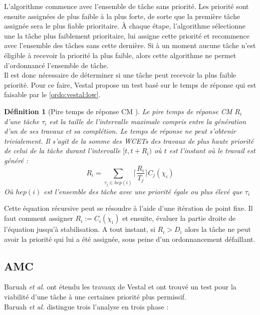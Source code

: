 \documentclass[12pt,a4paper,oneside]{book}
\theoremstyle{break}
\newtheorem{defin}{Définition}[chapter]
\theoremstyle{breakplain}
\begin{document}
L'algorithme commence avec l'ensemble de tâche sans priorité. Les priorité sont ensuite assignées de plus faible à la plus forte, de sorte que la première tâche assignée sera le plus fiable prioritaire. À chaque étape, l'algorithme sélectionne une la tâche plus faiblement prioritaire, lui assigne cette priorité et recommence avec l'ensemble des tâches sans cette dernière. Si à un moment aucune tâche n'est éligible à recevoir la priorité la plus faible, alors cette algorithme ne permet d'ordonnancé l'ensemble de tâche.\\

Il est donc nécessaire de déterminer si une tâche peut recevoir la plus faible priorité. Pour ce faire, Vestal propose un test basé sur le temps de réponse qui est faisable par le \autoref{ordo:vestal:low}. 


\begin{defin}[Pire temps de réponse CM \cite{vestal2007preemptive}]
Le pire temps de réponse CM $R_i$ d'une tâche $\tau_i$ est la taille de l'intervalle maximale compris entre la génération d'un de ses travaux et sa complétion. Le temps de réponse ne peut s'obtenir trivialement. Il s'agit de la somme des WCETs des travaux de plus haute priorité de celui de la tâche durant l'intervalle $[t, t+R_i)$ où $t$ est l'instant où le travail est généré :
\begin{equation}
R_i=\underset{\tau_j \in hep(i)}{\sum} \lceil\dfrac{R_i}{T_j}\rceil C_j(\chi_i)
\end{equation}
Où $hep(i)$ est l'ensemble des tâche avec une priorité égale ou  plus élevé que $\tau_i$
\end{defin}

Cette équation récursive peut se résoudre à l'aide d'une itération de point fixe. Il faut comment assigner $R_i := C_i(\chi_i)$ et ensuite, évaluer la partie droite de l'équation jusqu'à stabilisation. A tout instant, si $R_i > D_i$ alors la tâche ne peut avoir la priorité qui lui a été assignée, sous peine d'un ordonnancement défaillant.\\

\subsection{AMC}
Baruah \textit{et al.} ont étendu les travaux de Vestal et ont trouvé un test pour la viabilité d'une tâche à une certaines priorité plus permissif.\cite{baruah2011response}\\

Baruah \textit{et al.} distingue trois l'analyse en trois phase :
\end{document}
